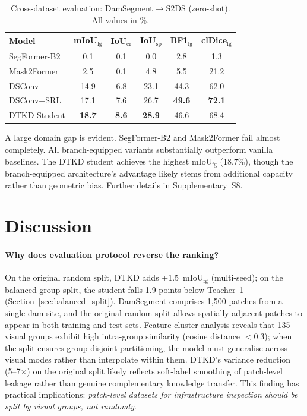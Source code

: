 \documentclass[review,authoryear]{elsarticle}
\begin{document}
\begin{table}[t]
\centering
\caption{Cross-dataset evaluation: DamSegment$\to$S2DS (zero-shot). All values in \%.}
\label{tab:cross_dataset}
\begin{tabular}{lccccc}
\toprule
Model & mIoU$_{\text{fg}}$ & IoU$_{\text{cr}}$ & IoU$_{\text{sp}}$ & BF1$_{\text{fg}}$ & clDice$_{\text{fg}}$ \\
\midrule
SegFormer-B2 & 0.1 & 0.1 & 0.0 & 2.8 & 1.3 \\
Mask2Former & 2.5 & 0.1 & 4.8 & 5.5 & 21.2 \\
DSConv & 14.9 & 6.8 & 23.1 & 44.3 & 62.0 \\
DSConv+SRL & 17.1 & 7.6 & 26.7 & \textbf{49.6} & \textbf{72.1} \\
DTKD Student & \textbf{18.7} & \textbf{8.6} & \textbf{28.9} & 46.6 & 68.4 \\
\bottomrule
\end{tabular}
\end{table}

A large domain gap is evident. SegFormer-B2 and Mask2Former fail almost completely. All branch-equipped variants substantially outperform vanilla baselines. The DTKD student achieves the highest mIoU$_{\text{fg}}$ (18.7\%), though the branch-equipped architecture's advantage likely stems from additional capacity rather than geometric bias.
Further details in Supplementary~S8.

\section{Discussion}
\label{sec:discussion}

\paragraph{Why does evaluation protocol reverse the ranking?}
On the original random split, DTKD adds +1.5~mIoU$_{\text{fg}}$ (multi-seed); on the balanced group split, the student falls 1.9 points below Teacher~1 (Section~\ref{sec:balanced_split}).
DamSegment comprises 1{,}500 patches from a single dam site, and the original random split allows spatially adjacent patches to appear in both training and test sets.
Feature-cluster analysis reveals that 135 visual groups exhibit high intra-group similarity (cosine distance $<$0.3); when the split ensures group-disjoint partitioning, the model must generalise across visual modes rather than interpolate within them.
DTKD's variance reduction (5--7$\times$) on the original split likely reflects soft-label smoothing of patch-level leakage rather than genuine complementary knowledge transfer.
This finding has practical implications: \emph{patch-level datasets for infrastructure inspection should be split by visual groups, not randomly}.
\end{document}
